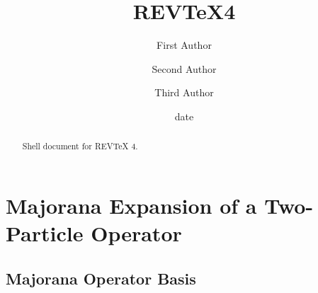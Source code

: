 \documentclass[aps,preprint]{revtex4}%
\begin{document}
\title[Short title for running header]{REV\TeX4}
\author{First Author}
\author{Second Author}
\author{Third Author}

\begin{abstract}
Shell document for REV\TeX{} 4.

\end{abstract}
\date[Date text]{date}




\maketitle
\tableofcontents


\section{Majorana Expansion of a Two-Particle Operator}

\subsection*{Majorana Operator Basis}
\end{document}
